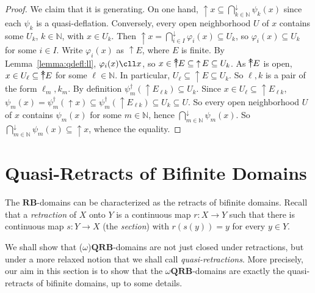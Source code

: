 \documentclass{LMCS}
\newcommand\nat{\mathbb{N}}
\newcommand\upc{\mathop{\uparrow}\nolimits}
\newcommand\uuarrow{\rlap{$\uparrow$}\raise.5ex\hbox{$\uparrow$}}\newcommand\ddarrow{\rlap{$\downarrow$}\raise.5ex\hbox{$\downarrow$}}\newcommand\Fin{\mathop{\text{Fin}}}
\newcommand\QRB{\mathbf{QRB}}
\newcommand\RB{\mathbf{RB}}
\begin{document}
\begin{proof}
  We claim that it is generating.  On one hand, $\upc x \subseteq
  \bigcap_{k \in \nat}^\downarrow \psi_k (x)$ since each $\psi_k$ is a
  quasi-deflation.  Conversely, every open neighborhood $U$ of $x$
  contains some $U_k$, $k \in \nat$, with $x \in U_k$.  Then $\upc x =
  \bigcap_{i \in I}^\downarrow \varphi_i (x) \subseteq U_k$, so
  $\varphi_i (x) \subseteq U_k$ for some $i \in I$.  Write $\varphi_i
  (x)$ as $\upc E$, where $E$ is finite.  By
  Lemma~\ref{lemma:qdefl:ll}, $\varphi_i (x) \cll x$, so $x \in
  \uuarrow E \subseteq \upc E \subseteq U_k$.  As $\uuarrow E$ is
  open, $x \in U_\ell \subseteq \uuarrow E$ for some $\ell \in \nat$.
  In particular, $U_\ell \subseteq \upc E \subseteq U_k$.  So $\ell,
  k$ is a pair of the form $\ell_m, k_m$.  By definition
  $\psi_m^\dagger (\upc E_{\ell k}) \subseteq U_k$.  Since $x \in
  U_\ell \subseteq \upc E_{\ell k}$, $\psi_m (x) = \psi_m^\dagger
  (\upc x) \subseteq \psi_m^\dagger (\upc E_{\ell k}) \subseteq U_k
  \subseteq U$.  So every open neighborhood $U$ of $x$ contains
  $\psi_m (x)$ for some $m \in \nat$, hence $\bigcap_{m \in
    \nat}^\downarrow \psi_m (x)$.  So $\bigcap_{m \in \nat}^\downarrow
  \psi_m (x) \subseteq \upc x$, whence the equality.
\end{proof}

\section{Quasi-Retracts of Bifinite Domains}
\label{sec:qretr}

The $\RB$-domains can be characterized as the retracts of bifinite
domains.  Recall that a {\em retraction\/} of $X$ onto $Y$ is a
continuous map $r : X \to Y$ such that there is continuous map $s : Y
\to X$ (the {\em section\/}) with $r (s (y)) = y$ for every $y \in Y$.

We shall show that ($\omega$)$\QRB$-domains are not just closed under
retractions, but under a more relaxed notion that we shall call {\em
  quasi-retractions\/}.  More precisely, our aim in this section is to
show that the $\omega\QRB$-domains are exactly the quasi-retracts of
bifinite domains, up to some details.
\end{document}
